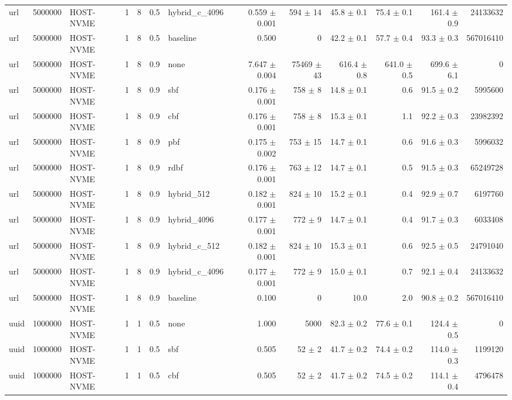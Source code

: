 \begin{tabular}{lllllllrrrrrr}
url & 5000000 & HOST-NVME & 1 & 8 & 0.5 & hybrid\_c\_4096 & 0.559 $\pm$ 0.001 & 594 $\pm$ 14 & 45.8 $\pm$ 0.1 & 75.4 $\pm$ 0.1 & 161.4 $\pm$ 0.9 & 24133632 \\
url & 5000000 & HOST-NVME & 1 & 8 & 0.5 & baseline & 0.500 & 0 & 42.2 $\pm$ 0.1 & 57.7 $\pm$ 0.4 & 93.3 $\pm$ 0.3 & 567016410 \\
url & 5000000 & HOST-NVME & 1 & 8 & 0.9 & none & 7.647 $\pm$ 0.004 & 75469 $\pm$ 43 & 616.4 $\pm$ 0.8 & 641.0 $\pm$ 0.5 & 699.6 $\pm$ 6.1 & 0 \\
url & 5000000 & HOST-NVME & 1 & 8 & 0.9 & sbf & 0.176 $\pm$ 0.001 & 758 $\pm$ 8 & 14.8 $\pm$ 0.1 & 0.6 & 91.5 $\pm$ 0.2 & 5995600 \\
url & 5000000 & HOST-NVME & 1 & 8 & 0.9 & cbf & 0.176 $\pm$ 0.001 & 758 $\pm$ 8 & 15.3 $\pm$ 0.1 & 1.1 & 92.2 $\pm$ 0.3 & 23982392 \\
url & 5000000 & HOST-NVME & 1 & 8 & 0.9 & pbf & 0.175 $\pm$ 0.002 & 753 $\pm$ 15 & 14.7 $\pm$ 0.1 & 0.6 & 91.6 $\pm$ 0.3 & 5996032 \\
url & 5000000 & HOST-NVME & 1 & 8 & 0.9 & rdbf & 0.176 $\pm$ 0.001 & 763 $\pm$ 12 & 14.7 $\pm$ 0.1 & 0.5 & 91.5 $\pm$ 0.3 & 65249728 \\
url & 5000000 & HOST-NVME & 1 & 8 & 0.9 & hybrid\_512 & 0.182 $\pm$ 0.001 & 824 $\pm$ 10 & 15.2 $\pm$ 0.1 & 0.4 & 92.9 $\pm$ 0.7 & 6197760 \\
url & 5000000 & HOST-NVME & 1 & 8 & 0.9 & hybrid\_4096 & 0.177 $\pm$ 0.001 & 772 $\pm$ 9 & 14.7 $\pm$ 0.1 & 0.4 & 91.7 $\pm$ 0.3 & 6033408 \\
url & 5000000 & HOST-NVME & 1 & 8 & 0.9 & hybrid\_c\_512 & 0.182 $\pm$ 0.001 & 824 $\pm$ 10 & 15.3 $\pm$ 0.1 & 0.6 & 92.5 $\pm$ 0.5 & 24791040 \\
url & 5000000 & HOST-NVME & 1 & 8 & 0.9 & hybrid\_c\_4096 & 0.177 $\pm$ 0.001 & 772 $\pm$ 9 & 15.0 $\pm$ 0.1 & 0.7 & 92.1 $\pm$ 0.4 & 24133632 \\
url & 5000000 & HOST-NVME & 1 & 8 & 0.9 & baseline & 0.100 & 0 & 10.0 & 2.0 & 90.8 $\pm$ 0.2 & 567016410 \\
uuid & 1000000 & HOST-NVME & 1 & 1 & 0.5 & none & 1.000 & 5000 & 82.3 $\pm$ 0.2 & 77.6 $\pm$ 0.1 & 124.4 $\pm$ 0.5 & 0 \\
uuid & 1000000 & HOST-NVME & 1 & 1 & 0.5 & sbf & 0.505 & 52 $\pm$ 2 & 41.7 $\pm$ 0.2 & 74.4 $\pm$ 0.2 & 114.0 $\pm$ 0.3 & 1199120 \\
uuid & 1000000 & HOST-NVME & 1 & 1 & 0.5 & cbf & 0.505 & 52 $\pm$ 2 & 41.7 $\pm$ 0.2 & 74.5 $\pm$ 0.2 & 114.1 $\pm$ 0.4 & 4796478 \\

\end{tabular}
